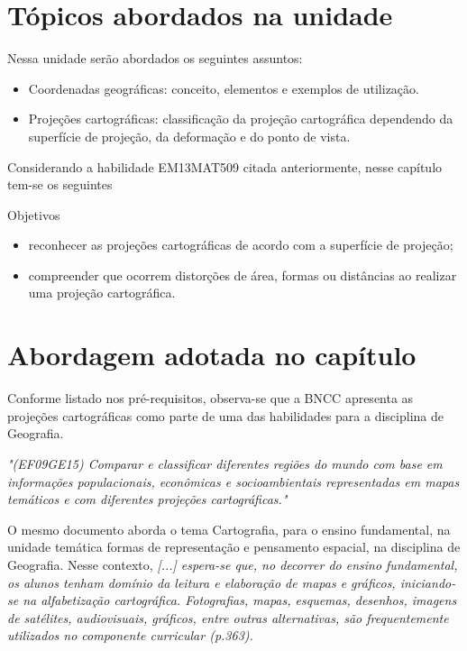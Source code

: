 \begin{apresentacao}
{\section*{Tópicos abordados na unidade}
Nessa unidade serão abordados os seguintes assuntos:
\begin{itemize}
\item Coordenadas geográficas: conceito, elementos e exemplos de utilização.
\item Projeções cartográficas: classificação da projeção cartográfica dependendo da superfície de projeção, da deformação e do ponto de vista.
\end{itemize}
  

Considerando a habilidade EM13MAT509 citada anteriormente, nesse capítulo tem-se os seguintes
\begin{habilities}{Objetivos}
\begin{itemize}
\item reconhecer as projeções cartográficas de acordo com a superfície de projeção;
\item compreender que ocorrem distorções de área, formas ou distâncias ao realizar uma projeção cartográfica. 
\end{itemize}
\end{habilities}

\section*{Abordagem adotada no capítulo}

Conforme listado nos pré-requisitos, observa-se que a BNCC  apresenta as projeções cartográficas como parte de uma das habilidades para a disciplina de Geografia.

\textit{"(EF09GE15) Comparar e classificar diferentes regiões do mundo com base em informações populacionais, econômicas e socioambientais representadas em mapas temáticos e com diferentes projeções cartográficas." \cite[p. 395]{BNCC2018}}

O mesmo documento aborda o tema Cartografia, para o ensino fundamental, na unidade temática formas de representação e pensamento espacial, na disciplina de Geografia. Nesse contexto, 
\textit{[...] espera-se que, no decorrer do ensino fundamental, os alunos tenham domínio da leitura e elaboração de mapas e gráficos, iniciando-se na alfabetização cartográfica. Fotografias, mapas, esquemas, desenhos, imagens de satélites, audiovisuais, gráficos, entre outras alternativas, são frequentemente utilizados no componente curricular (p.363). }

}
\end{apresentacao}
